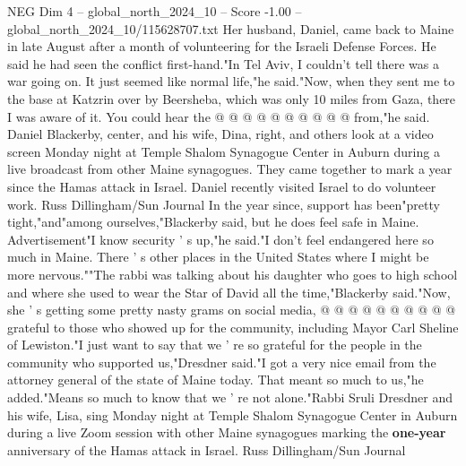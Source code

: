 \begin{textsample}{NEG Dim 4 – global\_north\_2024\_10 – Score -1.00 – global\_north\_2024\_10/115628707.txt}
Her husband, Daniel, came back to Maine in late August after a month of volunteering for the Israeli Defense Forces.
He said he had seen the conflict first-hand."In Tel Aviv, I couldn't tell there was a war going on.
It just seemed like normal life,"he said."Now, when they sent me to the base at Katzrin over by Beersheba, which was only 10 miles from Gaza, there I was aware of it.
You could hear the @ @ @ @ @ @ @ @ @ @ from,"he said.
Daniel Blackerby, center, and his wife, Dina, right, and others look at a video screen Monday night at Temple Shalom Synagogue Center in Auburn during a live broadcast from other Maine synagogues.
They came together to mark a year since the Hamas attack in Israel.
Daniel recently visited Israel to do volunteer work.
Russ Dillingham/Sun Journal In the year since, support has been"pretty tight,"and"among ourselves,"Blackerby said, but he does feel safe in Maine.
Advertisement"I know security ' s up,"he said."I don't feel endangered here so much in Maine.
There ' s other places in the United States where I might be more nervous.""The rabbi was talking about his daughter who goes to high school and where she used to wear the Star of David all the time,"Blackerby said."Now, she ' s getting some pretty nasty grams on social media, @ @ @ @ @ @ @ @ @ @ grateful to those who showed up for the community, including Mayor Carl Sheline of Lewiston."I just want to say that we ' re so grateful for the people in the community who supported us,"Dresdner said."I got a very nice email from the attorney general of the state of Maine today.
That meant so much to us,"he added."Means so much to know that we ' re not alone."Rabbi Sruli Dresdner and his wife, Lisa, sing Monday night at Temple Shalom Synagogue Center in Auburn during a live Zoom session with other Maine synagogues marking the \textbf{one-year} anniversary of the Hamas attack in Israel.
Russ Dillingham/Sun Journal

\end{textsample}
